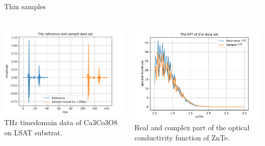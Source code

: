 \documentclass[aspectratio=1610, 9pt]{beamer}
\begin{document}
\begin{frame}{Thin samples}
  \begin{columns}
    \begin{column}{0.5\textwidth}
      \includegraphics[width=\textwidth]{images/2donSub/THz_timedomain.pdf}
      {THz timedomain data of Ca3Co3O8 on LSAT substrat.}
    \end{column} 
    \begin{column}{0.5\textwidth}
      \includegraphics[width=\textwidth]{images/2donSub/THz_FFT.pdf}
      {Real and complex part of the optical conductivity function of ZnTe.}
    \end{column}
  \end{columns}
\end{frame}
\end{document}
